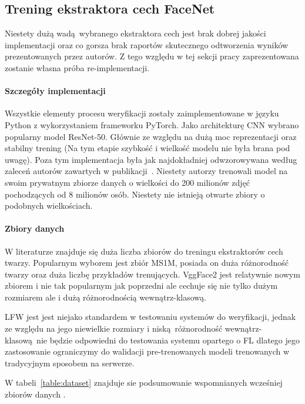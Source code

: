 

\subsection{Trening ekstraktora cech FaceNet}
Niestety dużą wadą wybranego ekstraktora cech jest brak dobrej jakości implementacji oraz co gorsza  brak raportów skutecznego odtworzenia wyników prezentowanych przez autorów. Z tego względu w tej sekcji pracy zaprezentowana zostanie własna próba re-implementacji.

\paragraph{Szczegóły implementacji}
Wszystkie elementy procesu weryfikacji zostały zaimplementowane w języku Python z wykorzystaniem
frameworku PyTorch. Jako architekturę CNN wybrano popularny model ResNet-50. Głównie ze względu
na dużą moc reprezentacji oraz stabilny trening (Na tym etapie szybkość i wielkość modelu nie
była brana pod uwagę). Poza tym implementacja była jak najdokładniej odwzorowywana według 
zaleceń autorów zawartych w publikacji~\cite{Facenet}.
Niestety autorzy trenowali model na swoim prywatnym zbiorze danych o wielkości do 200 milionów
zdjęć pochodzących od 8 milionów osób. Niestety nie istnieją otwarte zbiory o podobnych
wielkościach.

\paragraph{Zbiory danych}
W literaturze znajduje się duża liczba zbiorów do treningu ekstraktorów cech twarzy.
Popularnym wyborem jest zbiór MS1M, posiada on duża różnorodność twarzy oraz duża liczbę
przykładów trenujących. VggFace2 jest relatywnie nowym zbiorem i nie tak popularnym jak poprzedni
ale cechuje się nie tylko dużym rozmiarem ale i dużą różnorodnością wewnątrz-klasową.

LFW jest jest niejako standardem w testowaniu systemów do weryfikacji, jednak ze względu na jego niewielkie rozmiary i niską różnorodność wewnątrz-klasową nie będzie odpowiedni do testowania systemu opartego o FL dlatego jego zastosowanie ograniczymy do walidacji pre-trenowanych  modeli trenowanych w tradycyjnym sposobem na serwerze.

W tabeli~\ref{table:dataset} znajduje sie podsumowanie wspomnianych wcześniej zbiorów danych .

